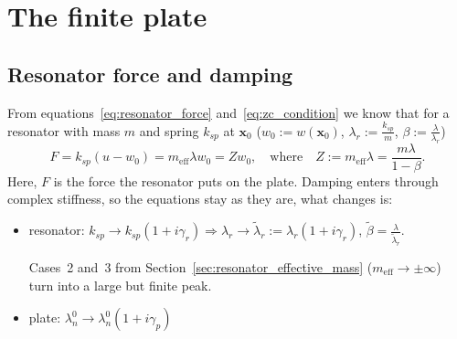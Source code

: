 
\providecommand{\fixed}[1]{{\color{blue!70!black}#1}}
\providecommand{\corr}[1]{\marginpar{\raggedright\footnotesize\color{red!70!black}#1}}

\chapter{The finite plate}
\label{ch:finite_plate}

\section{Resonator force and damping}

From equations~\eqref{eq:resonator_force} and~\eqref{eq:zc_condition} we know
that for a resonator with mass $m$ and spring $k_{sp}$ at $\mathbf{x}_0$
($w_0 := w(\mathbf{x}_0)$, $\lambda_r := \frac{k_{sp}}{m}$,
$\beta := \frac{\lambda}{\lambda_r}$)
\begin{equation}
  F = k_{sp}(u - w_0) = m_\mathrm{eff}\lambda w_0 = Z w_0 ,
  \quad\text{where}\quad
  Z := m_\mathrm{eff}\lambda = \frac{m\lambda}{1 - \beta} .
\end{equation}
Here, $F$ is the force the resonator puts on the plate. Damping enters through
complex stiffness, so the equations stay as they are, what changes is:
\begin{itemize}
  \item resonator: $k_{sp} \to k_{sp}(1 + i\gamma_r)
        \Rightarrow \lambda_r \to \tilde{\lambda}_r := \lambda_r(1 + i\gamma_r)$,
        $\tilde{\beta} = \frac{\lambda}{\tilde{\lambda}_r}$.%
        
        Cases~2 and~3 from Section~\ref{sec:resonator_effective_mass}
        ($m_\mathrm{eff} \to \pm\infty$) turn into a large but finite
        peak.
  \item plate: $\lambda_n^0 \to \lambda_n^0(1 + i\gamma_p)$
\end{itemize}

